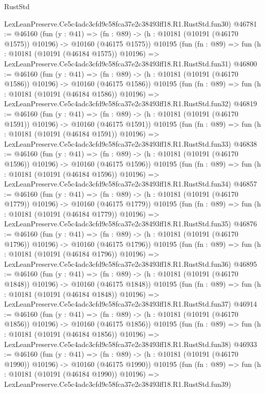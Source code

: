 \begin{lexlean}{RustStd}
\begin{coremodule}
    LexLeanPreserve.Ce5c4adc3cfd9c58fca37e2c38493ff18.R1.RustStd.fun30)
@46781 := @46160
    (fun (y : @41) =>
    (fn : @89) -> (h : @10181 (@10191 (@46170 @1575)) @10196) -> @10160 (@46175 @1575))
    @10195
    (fun (fn : @89) =>
    fun (h : @10181 (@10191 (@46184 @1575)) @10196) =>
    LexLeanPreserve.Ce5c4adc3cfd9c58fca37e2c38493ff18.R1.RustStd.fun31)
@46800 := @46160
    (fun (y : @41) =>
    (fn : @89) -> (h : @10181 (@10191 (@46170 @1586)) @10196) -> @10160 (@46175 @1586))
    @10195
    (fun (fn : @89) =>
    fun (h : @10181 (@10191 (@46184 @1586)) @10196) =>
    LexLeanPreserve.Ce5c4adc3cfd9c58fca37e2c38493ff18.R1.RustStd.fun32)
@46819 := @46160
    (fun (y : @41) =>
    (fn : @89) -> (h : @10181 (@10191 (@46170 @1591)) @10196) -> @10160 (@46175 @1591))
    @10195
    (fun (fn : @89) =>
    fun (h : @10181 (@10191 (@46184 @1591)) @10196) =>
    LexLeanPreserve.Ce5c4adc3cfd9c58fca37e2c38493ff18.R1.RustStd.fun33)
@46838 := @46160
    (fun (y : @41) =>
    (fn : @89) -> (h : @10181 (@10191 (@46170 @1596)) @10196) -> @10160 (@46175 @1596))
    @10195
    (fun (fn : @89) =>
    fun (h : @10181 (@10191 (@46184 @1596)) @10196) =>
    LexLeanPreserve.Ce5c4adc3cfd9c58fca37e2c38493ff18.R1.RustStd.fun34)
@46857 := @46160
    (fun (y : @41) =>
    (fn : @89) -> (h : @10181 (@10191 (@46170 @1779)) @10196) -> @10160 (@46175 @1779))
    @10195
    (fun (fn : @89) =>
    fun (h : @10181 (@10191 (@46184 @1779)) @10196) =>
    LexLeanPreserve.Ce5c4adc3cfd9c58fca37e2c38493ff18.R1.RustStd.fun35)
@46876 := @46160
    (fun (y : @41) =>
    (fn : @89) -> (h : @10181 (@10191 (@46170 @1796)) @10196) -> @10160 (@46175 @1796))
    @10195
    (fun (fn : @89) =>
    fun (h : @10181 (@10191 (@46184 @1796)) @10196) =>
    LexLeanPreserve.Ce5c4adc3cfd9c58fca37e2c38493ff18.R1.RustStd.fun36)
@46895 := @46160
    (fun (y : @41) =>
    (fn : @89) -> (h : @10181 (@10191 (@46170 @1848)) @10196) -> @10160 (@46175 @1848))
    @10195
    (fun (fn : @89) =>
    fun (h : @10181 (@10191 (@46184 @1848)) @10196) =>
    LexLeanPreserve.Ce5c4adc3cfd9c58fca37e2c38493ff18.R1.RustStd.fun37)
@46914 := @46160
    (fun (y : @41) =>
    (fn : @89) -> (h : @10181 (@10191 (@46170 @1856)) @10196) -> @10160 (@46175 @1856))
    @10195
    (fun (fn : @89) =>
    fun (h : @10181 (@10191 (@46184 @1856)) @10196) =>
    LexLeanPreserve.Ce5c4adc3cfd9c58fca37e2c38493ff18.R1.RustStd.fun38)
@46933 := @46160
    (fun (y : @41) =>
    (fn : @89) -> (h : @10181 (@10191 (@46170 @1990)) @10196) -> @10160 (@46175 @1990))
    @10195
    (fun (fn : @89) =>
    fun (h : @10181 (@10191 (@46184 @1990)) @10196) =>
    LexLeanPreserve.Ce5c4adc3cfd9c58fca37e2c38493ff18.R1.RustStd.fun39)

\end{coremodule}
\end{lexlean}
